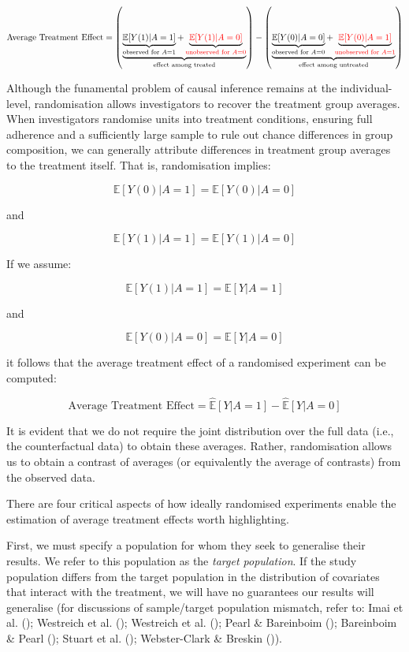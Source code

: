 \documentclass[
  single column]{article}
\begin{document}
\[
\text{Average Treatment Effect} = \left(\underbrace{\underbrace{\mathbb{E}[Y(1)|A = 1]}_{\text{observed for } A = 1} + \underbrace{\textcolor{red}{\mathbb{E}[Y(1)|A = 0]}}_{\textcolor{red}{\text{unobserved for } A = 0}}}_{\text{effect among treated}}\right) - \left(\underbrace{\underbrace{\mathbb{E}[Y(0)|A = 0]}_{\text{observed for } A = 0} + \underbrace{\textcolor{red}{\mathbb{E}[Y(0)|A = 1]}}_{\textcolor{red}{\text{unobserved for } A = 1}}}_{\text{effect among untreated}}\right)
\]

Although the funamental problem of causal inference remains at the
individual-level, randomisation allows investigators to recover the
treatment group averages. When investigators randomise units into
treatment conditions, ensuring full adherence and a sufficiently large
sample to rule out chance differences in group composition, we can
generally attribute differences in treatment group averages to the
treatment itself. That is, randomisation implies:

\[
\mathbb{E}[Y(0) | A = 1] = \mathbb{E}[Y(0) | A = 0]
\]

and

\[
\mathbb{E}[Y(1) | A = 1] = \mathbb{E}[Y(1) | A = 0]
\]

If we assume:

\[ 
\mathbb{E}[Y(1) | A = 1] = \mathbb{E}[Y | A = 1]
\]

and

\[
\mathbb{E}[Y(0) | A = 0] = \mathbb{E}[Y | A = 0]
\]

it follows that the average treatment effect of a randomised experiment
can be computed:

\[
\text{Average Treatment Effect} = \widehat{\mathbb{E}}[Y | A = 1] - \widehat{\mathbb{E}}[Y | A = 0]
\]

It is evident that we do not require the joint distribution over the
full data (i.e., the counterfactual data) to obtain these averages.
Rather, randomisation allows us to obtain a contrast of averages (or
equivalently the average of contrasts) from the observed data.

There are four critical aspects of how ideally randomised experiments
enable the estimation of average treatment effects worth highlighting.

First, we must specify a population for whom they seek to generalise
their results. We refer to this population as the \emph{target
population}. If the study population differs from the target population
in the distribution of covariates that interact with the treatment, we
will have no guarantees our results will generalise (for discussions of
sample/target population mismatch, refer to: Imai et al.
(); Westreich et al.
(); Westreich et al.
(); Pearl \& Bareinboim
(); Bareinboim \& Pearl
(); Stuart et al.
(); Webster-Clark \&
Breskin ()).
\end{document}
